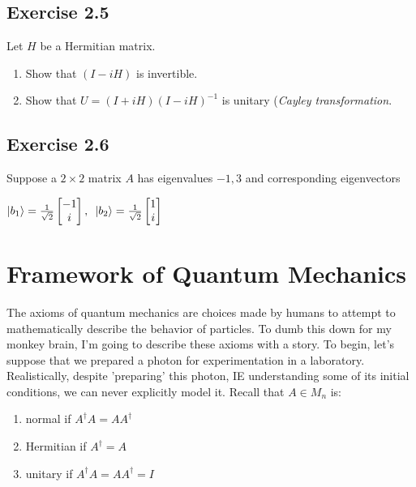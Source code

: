 \documentclass[12pt]{article}
\theoremstyle{plain}
\theoremstyle{nonumberplain}
\theoremstyle{plain}
\theoremstyle{nonumberplain}
\newcommand\1{{\bf 1}}
\newcommand{\bmat}[1]{\begin{bmatrix*} #1 \end{bmatrix*}} %
\newcommand{\<}{\left\langle}
\renewcommand{\>}{\right\rangle}
\begin{document}

\subsection{Exercise 2.5}
Let $H$ be a Hermitian matrix.
\begin{enumerate}[label=(\alph*)]
\item Show that $(I-iH)$ is invertible.
\item Show that $U=(I+iH)(I-iH)^{-1}$ is unitary (\textit{Cayley transformation}.
\end{enumerate}


\subsection{Exercise 2.6}
Suppose a $2\times 2$ matrix $A$ has eigenvalues $-1,3$ and corresponding eigenvectors
\begin{center}
$\ket{b_1}=\frac{1}{\sqrt{2}}\bmat{-1 \\ i},\text{ }\ket{b_2}=\frac{1}{\sqrt{2}}\bmat{1 \\ i}$
\end{center}



\section{Framework of Quantum Mechanics}

The axioms of quantum mechanics are choices made by humans to attempt to mathematically describe the behavior of particles. To dumb this down for my monkey brain, I'm going to describe these axioms with a story. To begin, let's suppose that we prepared a photon for experimentation in a laboratory. Realistically, despite 'preparing' this photon, IE understanding some of its initial conditions, we can never explicitly model it. Recall that $A\in M_n$ is:
\begin{enumerate}
\item normal if $A^\dagger A=AA^\dagger$
\item Hermitian if $A^\dagger=A$
\item unitary if $A^\dagger A=AA^\dagger=I$
\end{enumerate}
\end{document}

